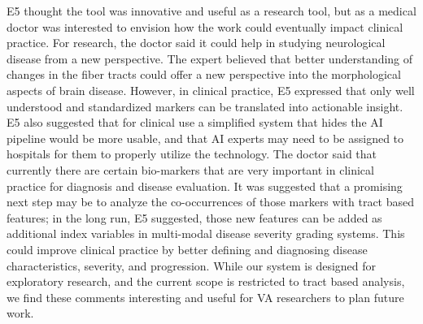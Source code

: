 E5 thought the tool was innovative and useful as a research tool, but as a medical doctor was interested to envision how the work could eventually impact clinical practice. For research, the doctor said it could help in studying neurological disease from a new perspective. The expert believed that better understanding of changes in the fiber tracts could offer a new perspective into the morphological aspects of brain disease. However, in clinical practice, E5 expressed that only well understood and standardized markers can be translated into actionable insight. E5 also suggested that for clinical use a simplified system that hides the AI pipeline would be more usable, and that AI experts may need to be assigned to hospitals for them to properly utilize the technology. The doctor said that currently there are certain bio-markers that are very important in clinical practice for diagnosis and disease evaluation. It was suggested that a promising next step may be to analyze the co-occurrences of those markers with tract based features; in the long run, E5 suggested, those new features can be added as additional index variables in multi-modal disease severity grading systems. This could improve clinical practice by better defining and diagnosing disease characteristics, severity, and progression. While our system is designed for exploratory research, and the current scope is restricted to tract based analysis, we find these comments interesting and useful for VA researchers to plan future work. 

